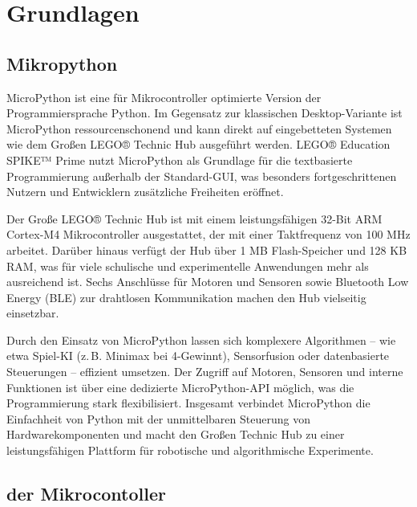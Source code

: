 \chapter{Grundlagen}
\section{Mikropython}


MicroPython ist eine für Mikrocontroller optimierte Version der Programmiersprache Python. Im Gegensatz zur klassischen Desktop-Variante ist MicroPython ressourcenschonend und kann direkt auf eingebetteten Systemen wie dem Großen LEGO® Technic Hub ausgeführt werden. LEGO® Education SPIKE™ Prime nutzt MicroPython als Grundlage für die textbasierte Programmierung außerhalb der Standard-GUI, was besonders fortgeschrittenen Nutzern und Entwicklern zusätzliche Freiheiten eröffnet.

Der Große LEGO® Technic Hub ist mit einem leistungsfähigen 32-Bit ARM Cortex-M4 Mikrocontroller ausgestattet, der mit einer Taktfrequenz von 100 MHz arbeitet. Darüber hinaus verfügt der Hub über 1 MB Flash-Speicher und 128 KB RAM, was für viele schulische und experimentelle Anwendungen mehr als ausreichend ist. Sechs Anschlüsse für Motoren und Sensoren sowie Bluetooth Low Energy (BLE) zur drahtlosen Kommunikation machen den Hub vielseitig einsetzbar.

Durch den Einsatz von MicroPython lassen sich komplexere Algorithmen – wie etwa Spiel-KI (z.\,B. Minimax bei 4-Gewinnt), Sensorfusion oder datenbasierte Steuerungen – effizient umsetzen. Der Zugriff auf Motoren, Sensoren und interne Funktionen ist über eine dedizierte MicroPython-API möglich, was die Programmierung stark flexibilisiert. Insgesamt verbindet MicroPython die Einfachheit von Python mit der unmittelbaren Steuerung von Hardwarekomponenten und macht den Großen Technic Hub zu einer leistungsfähigen Plattform für robotische und algorithmische Experimente.

\section{der Mikrocontoller}
